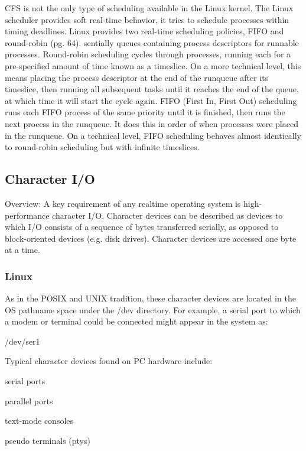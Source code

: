 \documentclass[10pt,draftclsnofoot,onecolumn,journal,compsoc]{IEEEtran}
\newcommand{\tab}{\hspace*{2em}} %
\begin{document}
\tab CFS is not the only type of scheduling available in the Linux kernel. The Linux scheduler provides soft real-time behavior, it tries to schedule processes within timing deadlines. Linux provides two real-time scheduling policies, FIFO and round-robin \cite{Love}(pg. 64). sentially queues containing process descriptors for runnable processes. Round-robin scheduling cycles through processes, running each for a pre-specified amount of time known as a timeslice. On a more technical level, this means placing the process descriptor at the end of the runqueue after its timeslice, then running all subsequent tasks until it reaches the end of the queue, at which time it will start the cycle again. FIFO (First In, First Out) scheduling runs each FIFO process of the same priority until it is finished, then runs the next process in the runqueue. It does this in order of when processes were placed in the runqueue. On a technical level, FIFO scheduling behaves almost identically to round-robin scheduling but with infinite timeslices.

\subsection{Character I/O}
\tab Overview: A key requirement of any realtime operating system is high-performance character I/O. Character devices can be described as devices to which I/O consists of a sequence of bytes transferred serially, as opposed to block-oriented devices (e.g. disk drives). Character devices are accessed one byte at a time.

\subsubsection*{Linux}
\tab As in the POSIX and UNIX tradition, these character devices are located in the OS pathname space under the /dev directory. For example, a serial port to which a modem or terminal could be connected might appear in the system as:\par

/dev/ser1\par

Typical character devices found on PC hardware include:\par

serial ports

parallel ports

text-mode consoles

pseudo terminals (ptys)
\end{document}
